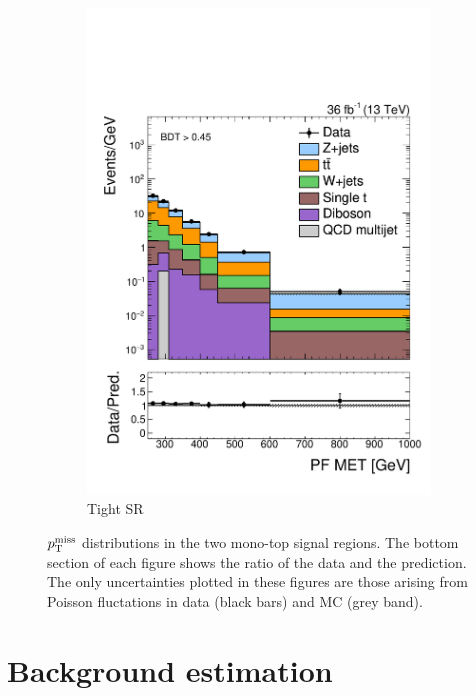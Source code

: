 \begin{figure}[!ht]
\begin{center}
\begin{subfigure}[t]{0.49\textwidth}
            \includegraphics[width=\textwidth]{figures/monotop/prefit/signal_tight_pfmet_logy.pdf}
            \caption{Tight SR}
        \end{subfigure}
        \caption{$p_\mathrm{T}^\mathrm{miss}$ distributions in the two mono-top signal regions.
                 The bottom section of each figure shows the ratio of the data and the prediction.
                 The only uncertainties plotted in these figures are those arising from Poisson fluctations in data (black bars) and MC (grey band).}
        \label{fig:mt:prefit_signals}
    \end{center}
\end{figure}

\clearpage

\section{Background estimation}
\label{sec:mt:bkg}

